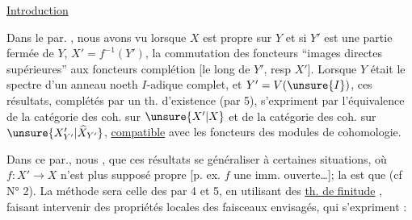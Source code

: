 
\uline{}

\uline{Introduction}

Dans le par. , nous avons vu  lorsque
$X$ est propre sur $Y$ 
 et si $Y'$ est une partie
fermée de $Y$, $X'=f^{-1}(Y')$, la 
commutation des foncteurs 
``images directes supérieures'' aux foncteurs complétion
[le long de $Y'$, resp $X'$].
Lorsque $Y$ était le spectre d'un anneau 
noeth $I$-adique complet, et $Y'=V(\unsure{I})$, ces résultats,
complétés par un th. d'existence (par 5), s'expriment
 
par l'équivalence de la catégorie des 
 coh. sur $\unsure{X'|X}$ et de la catégorie
des  coh. sur $\unsure{X'_{Y'}|\widehat X_{Y'}}$,
\uline{compatible} avec les foncteurs des modules de cohomologie.

Dans ce par., nous 
, que ces résultats 
se généraliser à certaines situations, où $f:X'\longrightarrow X$
n'est plus supposé propre [p. ex. $f$ une imm. ouverte\ldots];
la   
est que  
  (cf N° 2).
La méthode sera celle des par 4 et 5,
en utilisant des \uline{th. de finitude}
 
, faisant intervenir des propriétés
locales des faisceaux envisagés, qui s'expriment :

